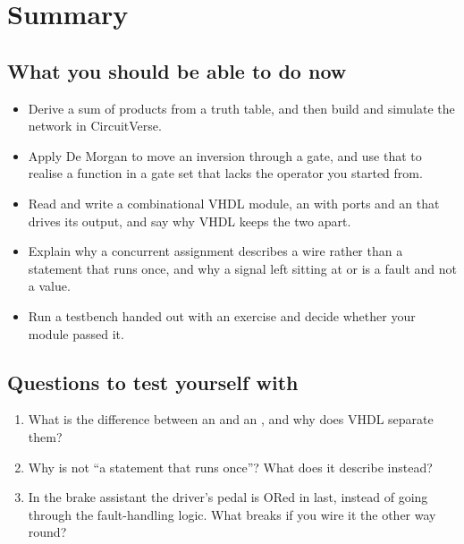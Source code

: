 
\section{Summary}
\label{c1:sec:review}

\subsection*{What you should be able to do now}
\begin{itemize}
  \item Derive a sum of products from a truth table, and then build and simulate the network in
    CircuitVerse.
  \item Apply De Morgan to move an inversion through a gate, and use that to realise a function in
    a gate set that lacks the operator you started from.
  \item Read and write a combinational VHDL module, an  with  ports
    and an  that drives its output, and say why VHDL keeps the two apart.
  \item Explain why a concurrent assignment describes a wire rather than a statement that runs
    once, and why a signal left sitting at  or  is a fault and not a value.
  \item Run a testbench handed out with an exercise and decide whether your module passed it.
\end{itemize}

\subsection*{Questions to test yourself with}
\begin{enumerate}
  \item What is the difference between an  and an , and why does
    VHDL separate them?
  \item Why is  not ``a statement that runs once''? What does it describe
    instead?
  \item In the brake assistant the driver's pedal is ORed in last, instead of going through the
    fault-handling logic. What breaks if you wire it the other way round?
\end{enumerate}

